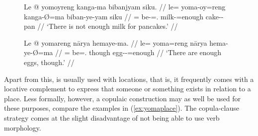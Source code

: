 \begin{figure}[h]
\pex\label{ex:yomareng}
\a\label{ex:yomareng_sg}\begingl
	\gla Le @ yomoyreng kanga-ma bibanjyam siku. //
	\glb le= yoma-oy=reng kanga-Ø=ma biban-ye-yam siku //
	\glc \PatTI{}= be-\Neg{}=\TsgI{}.\Aarg{} milk-\Top{}=enough
		cake-\Pl{}-\Dat {} pan //
	\glft `There is not enough milk for pancakes.' //
\endgl

\a\label{ex:yomareng_pl}\begingl
	\gla Le @ yomareng nārya hemaye-ma. //
	\glb le= yoma=reng nārya hema-ye-Ø=ma //
	\glc \PatTI{}= be=\TsgI{}.\Aarg{} though egg-\Pl{}-\Top{}=enough //
	\glft `There are enough eggs, though.' //
\endgl
\xe
\end{figure}

Apart from this,  is usually used with locations, that is, it
frequently comes with a locative complement to express that someone or
something exists in relation to a place. Less formally, however, a copulaic
construction may as well be used for these purposes, compare the examples in
(\ref{ex:yomaplace}). The copula-clause strategy comes at the
slight disadvantage of not being able to use verb morphology.

